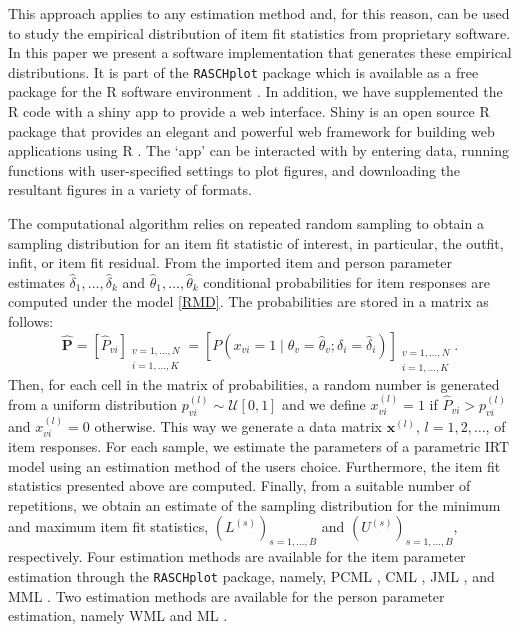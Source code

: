 \documentclass[11pt,a4paper]{article}
\begin{document}
This approach applies to any estimation method and, for this reason, can be used to study the empirical distribution of item fit statistics from proprietary software. In this paper we present a software implementation that generates these empirical distributions. It is part of the \texttt{RASCHplot} package which is available as a free package for the R software environment \cite{R}. In addition, we have supplemented the R code with a shiny app \cite{shiny} to provide a web interface. Shiny is an open source R package that provides an elegant and powerful web framework for building web applications using R \cite{beeley2013}. The ‘app’ can be interacted with by entering data, running functions with user-specified settings to plot figures, and downloading the resultant figures in a variety of formats.

The computational algorithm relies on repeated random sampling to obtain a sampling distribution for an item fit statistic of interest, in particular, the outfit, infit, or item fit residual. From the imported item and person parameter estimates $\hat\delta_1,\ldots,\hat\delta_k$ and $\hat\theta_1,\ldots,\hat\theta_k$ conditional probabilities for item responses are computed under the model \eqref{RMD}. The probabilities are stored in a matrix as follows:
\begin{equation}
\boldsymbol{\hat{P}}
=
\left[\hat{P}_{vi}\right]_{\substack{v=1,\ldots,N \\ i=1,\ldots,K}}
=
\left[P(x_{vi}=1 \mid \theta_v=\hat\theta_v; \delta_i=\hat\delta_i)\right]_{\substack{v=1,\ldots,N \\ i=1,\ldots,K}}.
\label{probability-matrix}
\end{equation}
Then, for each cell in the matrix of probabilities, a random number is generated from a uniform distribution $p^{(l)}_{vi} \sim \mathcal{U}[0,1]$ and we define $x^{(l)}_{vi}=1$ if $\hat{P}_{vi} > p^{(l)}_{vi}$ and $x^{(l)}_{vi}=0$ otherwise. This way we generate a data matrix  $\mathbf{x}^{(l)}$, $l=1,2,\ldots$, of item responses.
For each sample, we estimate the parameters of a parametric IRT model using an estimation method of the users choice. Furthermore, the item fit statistics presented above are computed. Finally, from a suitable number of repetitions, we obtain an estimate of the sampling distribution for the minimum and maximum item fit statistics, $(L^{(s)})_{s=1,\ldots,B}$ and $(U^{(s)})_{s=1,\ldots,B}$, respectively. Four estimation  methods are available for the item parameter estimation through the \texttt{RASCHplot} package, namely,
PCML \cite{sirt}, CML \cite{erm}, JML  \cite{tam}, and MML \cite{tam}.
Two estimation methods are available for the person parameter estimation, namely WML and ML \cite{sirt}. 
\end{document}
